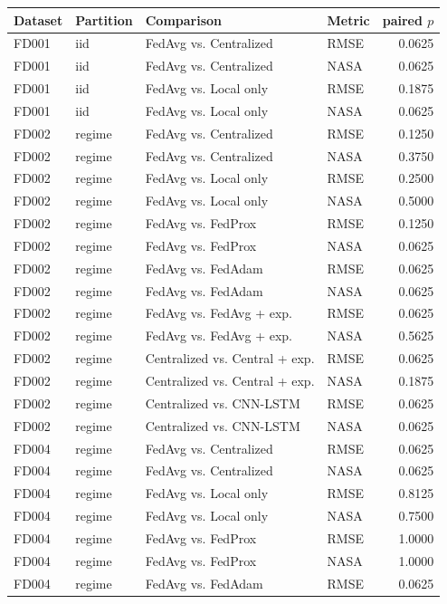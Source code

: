 \begin{tabular}{llllr}
\toprule
Dataset & Partition & Comparison & Metric & paired $p$ \\
\midrule
FD001 & iid & FedAvg vs. Centralized & RMSE & 0.0625 \\
FD001 & iid & FedAvg vs. Centralized & NASA & 0.0625 \\
FD001 & iid & FedAvg vs. Local only & RMSE & 0.1875 \\
FD001 & iid & FedAvg vs. Local only & NASA & 0.0625 \\
FD002 & regime & FedAvg vs. Centralized & RMSE & 0.1250 \\
FD002 & regime & FedAvg vs. Centralized & NASA & 0.3750 \\
FD002 & regime & FedAvg vs. Local only & RMSE & 0.2500 \\
FD002 & regime & FedAvg vs. Local only & NASA & 0.5000 \\
FD002 & regime & FedAvg vs. FedProx & RMSE & 0.1250 \\
FD002 & regime & FedAvg vs. FedProx & NASA & 0.0625 \\
FD002 & regime & FedAvg vs. FedAdam & RMSE & 0.0625 \\
FD002 & regime & FedAvg vs. FedAdam & NASA & 0.0625 \\
FD002 & regime & FedAvg vs. FedAvg + exp. & RMSE & 0.0625 \\
FD002 & regime & FedAvg vs. FedAvg + exp. & NASA & 0.5625 \\
FD002 & regime & Centralized vs. Central + exp. & RMSE & 0.0625 \\
FD002 & regime & Centralized vs. Central + exp. & NASA & 0.1875 \\
FD002 & regime & Centralized vs. CNN-LSTM & RMSE & 0.0625 \\
FD002 & regime & Centralized vs. CNN-LSTM & NASA & 0.0625 \\
FD004 & regime & FedAvg vs. Centralized & RMSE & 0.0625 \\
FD004 & regime & FedAvg vs. Centralized & NASA & 0.0625 \\
FD004 & regime & FedAvg vs. Local only & RMSE & 0.8125 \\
FD004 & regime & FedAvg vs. Local only & NASA & 0.7500 \\
FD004 & regime & FedAvg vs. FedProx & RMSE & 1.0000 \\
FD004 & regime & FedAvg vs. FedProx & NASA & 1.0000 \\
FD004 & regime & FedAvg vs. FedAdam & RMSE & 0.0625 \\

\end{tabular}
